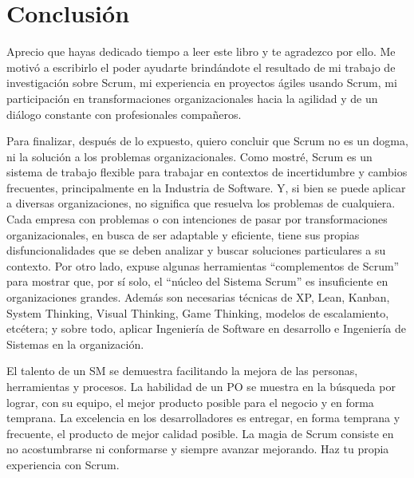 \chapter{Conclusión}

Aprecio que hayas dedicado tiempo a leer este libro y te agradezco por ello. Me motivó a escribirlo el poder ayudarte brindándote el resultado de mi trabajo de investigación sobre Scrum, mi experiencia en proyectos ágiles usando Scrum, mi participación en transformaciones organizacionales hacia la agilidad y de un diálogo constante con profesionales compañeros. 

Para finalizar, después de lo expuesto, quiero concluir que Scrum no es un dogma, ni la solución a los problemas organizacionales. Como mostré, Scrum es un sistema de trabajo flexible para trabajar en contextos de incertidumbre y cambios frecuentes, principalmente en la Industria de Software. Y, si bien se puede aplicar a diversas organizaciones, no significa que resuelva los problemas de cualquiera. Cada empresa con problemas o con intenciones de pasar por transformaciones organizacionales, en busca de ser adaptable y eficiente, tiene sus propias disfuncionalidades que se deben analizar y buscar soluciones particulares a su contexto. Por otro lado, expuse algunas herramientas “complementos de Scrum” para mostrar que, por sí solo, el “núcleo del Sistema Scrum” es insuficiente en organizaciones grandes. Además son necesarias técnicas de XP, Lean, Kanban, System Thinking, Visual Thinking, Game Thinking, modelos de escalamiento, etcétera; y sobre todo, aplicar Ingeniería de Software en desarrollo e Ingeniería de Sistemas en la organización.

El talento de un SM se demuestra facilitando la mejora de las personas, herramientas y procesos. La habilidad de un PO se muestra en la búsqueda por lograr, con su equipo, el mejor producto posible para el negocio y en forma temprana. La excelencia en los desarrolladores es entregar, en forma temprana y frecuente, el producto de mejor calidad posible. La magia de Scrum consiste en no acostumbrarse ni conformarse y siempre avanzar mejorando. Haz tu propia experiencia con Scrum.
